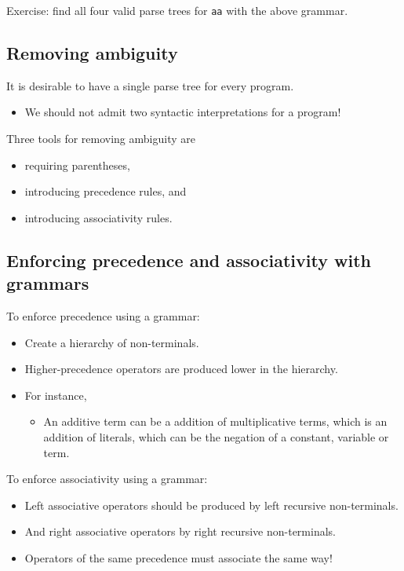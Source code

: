 \documentclass[11pt]{article}
\theoremstyle{definition}
\begin{document}
Exercise: find all four valid parse trees for \texttt{aa} with the above
grammar.

\subsection{Removing ambiguity}
\label{sec:org8bbf8a5}

It is desirable to have a single parse tree for every program.
\begin{itemize}
\item We should not admit two syntactic interpretations for a program!
\end{itemize}

Three tools for removing ambiguity are
\begin{itemize}
\item requiring parentheses,
\item introducing precedence rules, and
\item introducing associativity rules.
\end{itemize}

\subsection{Enforcing precedence and associativity with grammars}
\label{sec:org332c166}

To enforce precedence using a grammar:
\begin{itemize}
\item Create a hierarchy of non-terminals.
\item Higher-precedence operators are produced lower in the hierarchy.
\item For instance,
\begin{itemize}
\item An additive term can be a addition of multiplicative terms,
which is an addition of literals, which can be the negation
of a constant, variable or term.
\end{itemize}
\end{itemize}

To enforce associativity using a grammar:
\begin{itemize}
\item Left associative operators should be produced by left recursive
non-terminals.
\item And right associative operators by right recursive non-terminals.
\item Operators of the same precedence must associate the same way!
\end{itemize}
\end{document}

